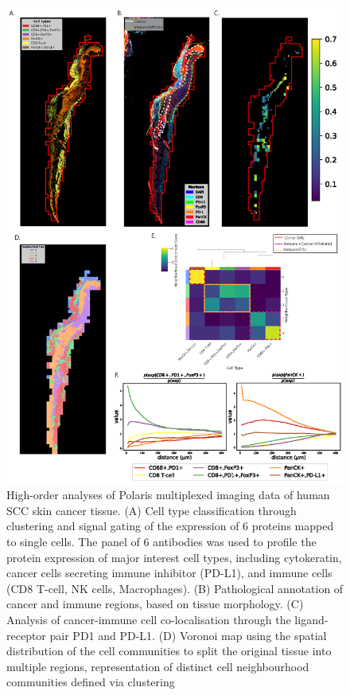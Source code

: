\begin{figure}
    \centering
    \includegraphics[width=0.8\columnwidth]{Chapter3/Figures/Minh_figure3-01.png}
    \caption[Analyses of Polaris multiplexed imaging of human SCC skin cancer tissue. ]{High-order analyses of Polaris multiplexed imaging data of human SCC skin cancer tissue. (A) Cell type classification through clustering and signal gating of the expression of 6 proteins mapped to single cells. The panel of 6 antibodies was used to profile the protein expression of major interest cell types, including cytokeratin, cancer cells secreting immune inhibitor (PD-L1), and immune cells (CD8 T-cell, NK cells, Macrophages). (B) Pathological annotation of cancer and immune regions, based on tissue morphology. (C) Analysis of cancer-immune cell co-localisation through the ligand-receptor pair PD1 and PD-L1. (D) Voronoi map using the spatial distribution of the cell communities to split the original tissue into multiple regions, representation of distinct cell neighbourhood communities defined via clustering}
    \label{fig:skin_cancer_polaris}
    
\end{figure}

